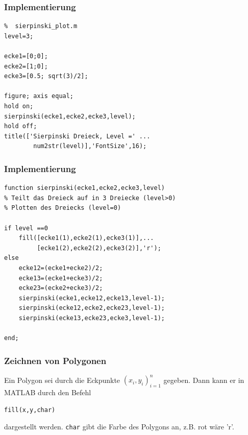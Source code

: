 %
%
\begin{frame}[fragile]\frametitle{Implementierung}
\begin{lstlisting}
%  sierpinski_plot.m
level=3;

ecke1=[0;0];
ecke2=[1;0];
ecke3=[0.5; sqrt(3)/2];

figure; axis equal;
hold on;
sierpinski(ecke1,ecke2,ecke3,level);
hold off;
title(['Sierpinski Dreieck, Level =' ...
        num2str(level)],'FontSize',16);
\end{lstlisting}
\end{frame}
%
%
\begin{frame}[fragile]\frametitle{Implementierung}
\begin{lstlisting}
function sierpinski(ecke1,ecke2,ecke3,level)
% Teilt das Dreieck auf in 3 Dreiecke (level>0)
% Plotten des Dreiecks (level=0)

if level ==0 
    fill([ecke1(1),ecke2(1),ecke3(1)],...
         [ecke1(2),ecke2(2),ecke3(2)],'r');
else
    ecke12=(ecke1+ecke2)/2;
    ecke13=(ecke1+ecke3)/2;
    ecke23=(ecke2+ecke3)/2;
    sierpinski(ecke1,ecke12,ecke13,level-1);
    sierpinski(ecke12,ecke2,ecke23,level-1);
    sierpinski(ecke13,ecke23,ecke3,level-1);
    
end;
\end{lstlisting}
\end{frame}
% 
% 
\begin{frame}[fragile]\frametitle{Zeichnen von Polygonen}

Ein Polygon sei durch die Eckpunkte $(x_i,y_i)_{i=1}^n$ gegeben. Dann
kann er in MATLAB durch den Befehl
\begin{lstlisting}
fill(x,y,char)
\end{lstlisting}
dargestellt werden. \lstinline!char! gibt die Farbe des Polygons an, z.B. rot
wäre 'r'.
\end{frame}
%
%
